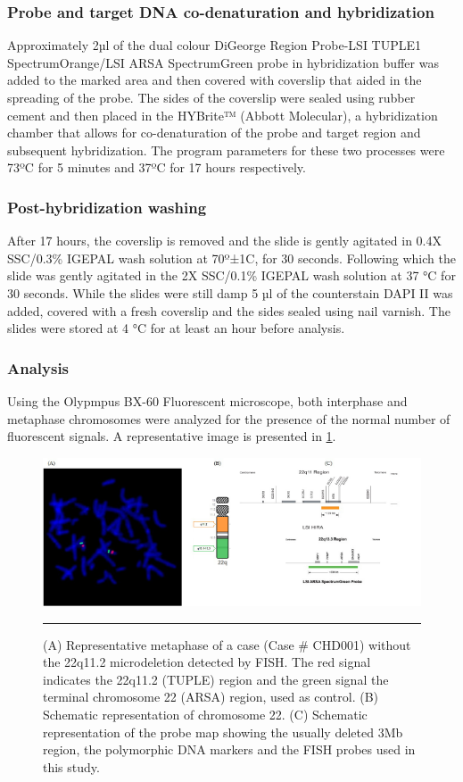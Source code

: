\subsubsection{Probe and target DNA co-denaturation and hybridization}
Approximately 2µl of the dual colour DiGeorge Region Probe-LSI TUPLE1 SpectrumOrange/LSI ARSA SpectrumGreen probe in hybridization buffer was added to the marked area and then covered with coverslip that aided in the spreading of the probe. The sides of the coverslip were sealed using rubber cement and then placed in the HYBrite™ (Abbott Molecular), a hybridization chamber that allows for co-denaturation of the probe and target region and subsequent hybridization. The program parameters for these two processes were 73ºC for 5 minutes and 37ºC for 17 hours respectively.
\subsubsection{Post-hybridization washing}
After 17 hours, the coverslip is removed and the slide is gently agitated in 0.4X SSC/0.3\% IGEPAL wash solution at 70º±1C, for 30 seconds. Following which the slide was gently agitated in the 2X SSC/0.1\% IGEPAL wash solution at 37 °C for 30 seconds. While the slides were still damp 5 µl of the counterstain DAPI II was added, covered with a fresh coverslip and the sides sealed using nail varnish. The slides were stored at 4 °C for at least an hour before analysis.
\subsubsection{Analysis}
Using the Olypmpus BX-60 Fluorescent microscope, both interphase and metaphase chromosomes were analyzed for the presence of the normal number of fluorescent signals. A representative image is presented in \cref{fig:2_4fishcase}.

\begin{figure}[!tb]
\centering
\includegraphics[width=\linewidth]{Figures/2_4fishcase.pdf} 
\rule{35em}{0.5pt}
\caption{(A) Representative metaphase of a case (Case \# CHD001) without the 22q11.2 microdeletion detected by FISH. The red signal indicates the 22q11.2 (TUPLE) region and the green signal the terminal chromosome 22 (ARSA) region, used as control. (B) Schematic representation of chromosome 22. (C) Schematic representation of the probe map showing the usually deleted 3Mb region, the polymorphic DNA markers and the FISH probes used in this study.}
\label{fig:2_4fishcase}
\end{figure}

